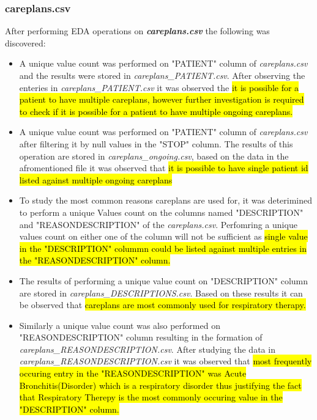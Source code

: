 \documentclass[12pt, twosided]{report}  %
\begin{document}
\subsubsection{careplans.csv}
After performing EDA operations on \textbf{\textit{careplans.csv}} the following was discovered:
\begin{itemize}
	\item A unique value count was performed on "PATIENT" column of \textit{careplans.csv} and the results were stored in \textit{careplans\_PATIENT.csv}. After observing the enteries in \textit{careplans\_PATIENT.csv} it was observed the \hl{it is possible for a patient to  have multiple careplans, however further investigation is required to check if it is possible for a patient to have multiple ongoing careplans.}
	
	\item A unique value count was performed on "PATIENT" column of \textit{careplans.csv} after filtering it by null values in the "STOP" column. The results of this operation are stored in \textit{careplans\_ongoing.csv}, based on the data in the afromentioned file it was observed that \hl{it is possible to have single patient id listed against multiple ongoing careplans}
	
	\item To study the most common reasons careplans are used for, it was deterimined to perform a unique Values count on the columns named "DESCRIPTION" and "REASONDESCRIPTION" of the \textit{careplans.csv}. Perfomring a unique values count on either one of the column will not be sufficient as \hl{single value in the "DESCRIPTION" colummn could be listed  against multiple entries in the "REASONDESCRIPTION" column.}
	
	\item The results of performing a unique value count on "DESCRIPTION" column are stored in \textit{careplans\_DESCRIPTIONS.csv}. Based on these results it can be observed that \hl{careplans are most commonly used for respiratory therapy.}
	
	\item Similarly a unique value count was also performed on "REASONDESCRIPTION" column resulting in the formation of \textit{careplans\_REASONDESCRIPTION.csv}. After studying the data in \textit{careplans\_REASONDESCRIPTION.csv} it was observed that \hl{most frequently occuring entry in the "REASONDESCRIPTION" was Acute Bronchitis(Disorder) which is a respiratory disorder thus justifying the fact that Respiratory Therepy is the most commonly occuring value in the "DESCRIPTION" column.}
	

\end{itemize}
\end{document}
